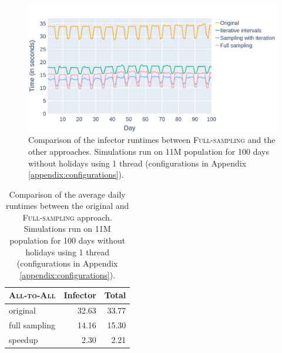 \begin{figure}
    \centering
    \includegraphics[width=\textwidth]{4 - Sampling/fig/full_sampling/fs_pType_vs_rest_infector.png}
    \caption{Comparison of the infector runtimes between \textsc{Full-sampling} and the other approaches. Simulations run on 11M population for 100 days without holidays using 1 thread (configurations in Appendix \ref{appendix:configurations}).}
    \label{fig:fs_pType_vs_rest_infector}
\end{figure}

\begin{table}
    \centering
    \begin{tabular}{@{}lrr@{}}
        \toprule
        \textsc{All-to-All} & Infector & Total \\ \midrule
        original & 32.63 & 33.77 \\
        full sampling & 14.16 & 15.30 \\ \hdashline[1pt/1pt]
        speedup & 2.30 & 2.21 \\ \bottomrule
    \end{tabular}
    \caption{Comparison of the average daily runtimes between the original and \textsc{Full-sampling} approach. Simulations run on 11M population for 100 days without holidays using 1 thread (configurations in Appendix \ref{appendix:configurations}).}
    \label{tab:fs_pType_vs_standard_runtimes}
\end{table}

